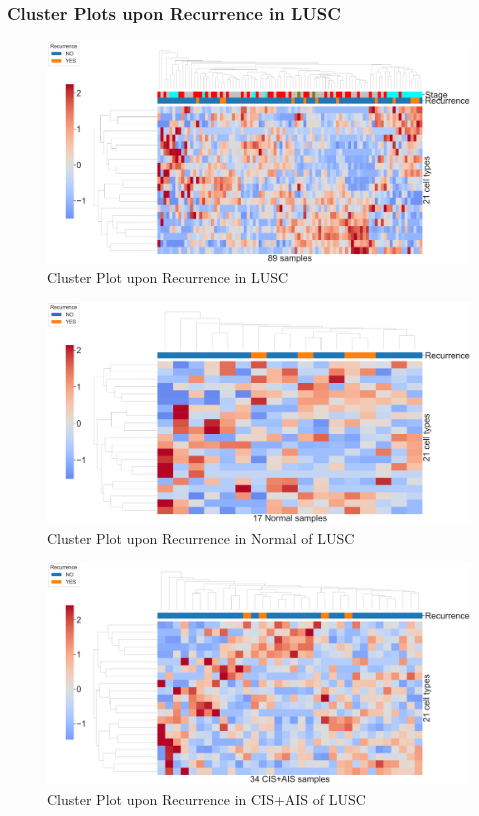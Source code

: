 \documentclass{beamer}
\begin{document}
    \begin{frame}[allowframebreaks]
        \frametitle{Cluster Plots upon Recurrence in LUSC}

        \begin{figure}
            \includegraphics[width=0.9 \linewidth]{figures/BisqueRNA/clustermap/STAR.FPKM.GSE162498.SQC.Recurrence/All.pdf}
            \caption{Cluster Plot upon Recurrence in LUSC}
        \end{figure}

        \begin{figure}
            \includegraphics[width=0.9 \linewidth]{figures/BisqueRNA/clustermap/STAR.FPKM.GSE162498.SQC.Recurrence/Normal.pdf}
            \caption{Cluster Plot upon Recurrence in Normal of LUSC}
        \end{figure}

        \begin{figure}
            \includegraphics[width=0.9 \linewidth]{figures/BisqueRNA/clustermap/STAR.FPKM.GSE162498.SQC.Recurrence/CIS+AIS.pdf}
            \caption{Cluster Plot upon Recurrence in CIS+AIS of LUSC}
        \end{figure}


\end{frame}
\end{document}
